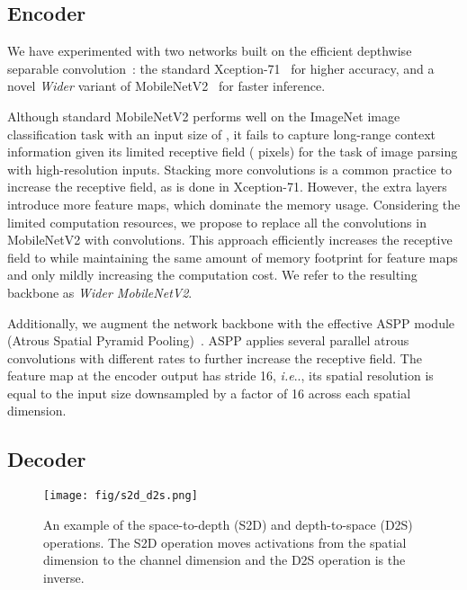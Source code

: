 \documentclass[10pt,twocolumn,letterpaper]{article}
\makeatletter
\def\@onedot{\ifx\@let@token.\else.\null\fi\xspace}
\DeclareRobustCommand\onedot{\futurelet\@let@token\@onedot}
\def\ie{\emph{i.e}\onedot} \def\Ie{\emph{I.e}\onedot}
\makeatother
\begin{document}
\subsection{Encoder}

We have experimented with two networks built on the efficient depthwise separable convolution~\cite{howard2017mobilenets}: the standard Xception-71~\cite{chollet2016xception,dai2017coco,deeplabv3plus2018} for higher accuracy, and a novel \emph{Wider} variant of MobileNetV2~\cite{mobilenetv22018} for faster inference.

Although standard MobileNetV2 performs well on the ImageNet image classification task with an input size of , it fails to capture long-range context information given its limited receptive field ( pixels) for the task of image parsing with high-resolution inputs. Stacking more  convolutions is a common practice to increase the receptive field, as is done in Xception-71. However, the extra layers introduce more feature maps, which dominate the memory usage. Considering the limited computation resources, we propose to replace all the  convolutions in MobileNetV2 with  convolutions. This approach efficiently increases the receptive field to  while maintaining the same amount of memory footprint for feature maps and only mildly increasing the computation cost. We refer to the resulting backbone as \emph{Wider MobileNetV2}.

Additionally, we augment the network backbone with the effective ASPP module (Atrous Spatial Pyramid Pooling)~\cite{chen2017deeplab,chen2017rethinking}. ASPP applies several parallel atrous convolutions with different rates to further increase the receptive field. The feature map at the encoder output has stride 16, \ie, its spatial resolution is equal to the input size downsampled by a factor of 16 across each spatial dimension.

\subsection{Decoder}

\begin{figure}[!t]
    \centering
    \texttt{[image: fig/s2d\_d2s.png]}
    \caption{An example of the space-to-depth (S2D) and depth-to-space (D2S) operations. The S2D operation moves activations from the spatial dimension to the channel dimension and the D2S operation is the inverse.}
    \label{fig:s2d}
\end{figure}
\end{document}
